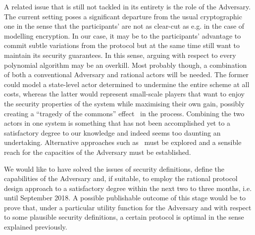   A related issue that is still not tackled in its entirety is the role of the Adversary.
  The current setting poses a significant departure from the usual cryptographic one in
  the sense that the participants' are not as clear-cut as e.g. in the case of modelling
  encryption. In our case, it may be to the participants' advantage to commit subtle
  variations from the protocol but at the same time still want to maintain its security
  guarantees. In this sense, arguing with respect to every polynomial algorithm may be an
  overkill. Most probably though, a combination of both a conventional Adversary and
  rational actors will be needed. The former could model a state-level actor determined to
  undermine the entire scheme at all costs, whereas the latter would represent small-scale
  players that want to enjoy the security properties of the system while maximising their
  own gain, possibly creating a ``tragedy of the commons'' effect~\cite{tragedy} in the
  process. Combining the two actors in one system is something that has not been
  accomplished yet to a satisfactory degree to our knowledge and indeed seems too daunting
  an undertaking.  Alternative approaches such as~\cite{rationalprotocol} must be explored
  and a sensible reach for the capacities of the Adversary must be established.

  We would like to have solved the issues of security definitions, define the capabilities
  of the Adversary and, if suitable, to employ the rational protocol design approach to a
  satisfactory degree within the next two to three months, i.e. until September 2018. A
  possible publishable outcome of this stage would be to prove that, under a particular
  utility function for the Adversary and with respect to some plausible security
  definitions, a certain protocol is optimal in the sense explained previously.
